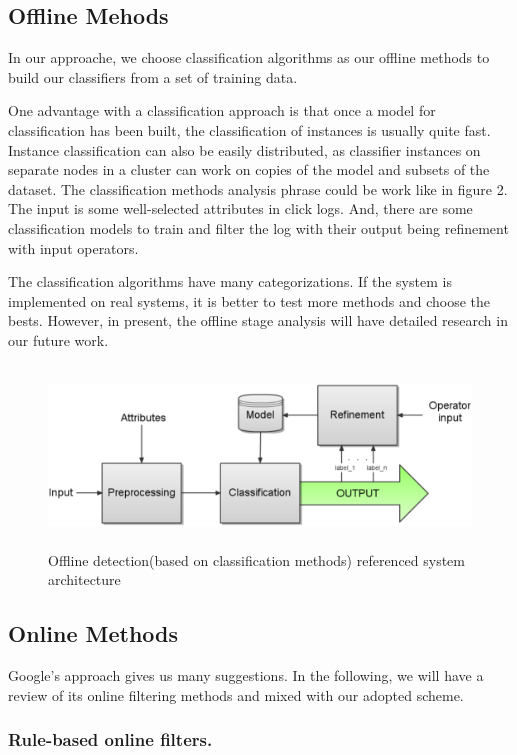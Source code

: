 \documentclass[runningheads,report]{llncs}
\begin{document}
\subsection{Offline Mehods}
In our approache, we choose classification algorithms as our offline methods to build our classifiers from a set of training data.

One advantage with a classification approach is that once a model for classification has been built, the classification of instances is usually quite fast. Instance classification can also be easily distributed, as classifier instances on separate nodes in a cluster can work on copies of the model and subsets of the dataset\cite{Martin:Thesis:2010}. The classification methods analysis phrase could be work like in figure 2. The input is some well-selected attributes in click logs. And, there are some classification models to train and filter the log with their output being refinement with input operators.


The classification algorithms have many categorizations. If the system is implemented on real systems, it is better to test more methods and choose the bests. However, in present, the offline stage analysis will have detailed research in our future work.


\begin{figure}
\centering
\includegraphics[height=4.8cm]{pic/classifier}
\caption{Offline detection(based on classification methods) referenced system architecture}
\label{fig:classifier}
\end{figure}

\subsection{Online Methods}

Google's approach gives us  many suggestions\cite{website:GoogleReport}. In the following, we will have a review of its online filtering methods and mixed with our adopted scheme.

\subsubsection{Rule-based online filters.}
\end{document}
